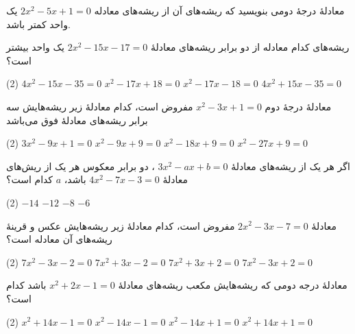 \begin{example}
معادلۀ درجۀ دومی بنویسید که ریشه‌های آن از ریشه‌های
معادله \(2x^2-5x+1=0\) یک واحد کمتر باشد.
\end{example}

\begin{example}
ریشه‌های کدام معادله از دو برابر ریشه‌های معادلۀ
$2x^2-15x-17=0$
یک واحد بیشتر است؟

\begin{tasks}(2)
    \task $4x^2-15x-35=0$
    \task $x^2-17x+18=0$
    \task $x^2-17x-18=0$
    \task $4x^2+15x-35=0$
\end{tasks}
\end{example}

\begin{example}
معادلۀ درجۀ دوم
$x^2-3x+1=0$
مفروض است، کدام معادلۀ زیر ریشه‌هایش سه برابر ریشه‌های معادلۀ فوق می‌باشد

\begin{tasks}(2)
    \task $3x^2-9x+1=0$
    \task $x^2-9x+9=0$
    \task $x^2-18x+9=0$
    \task $x^2-27x+9=0$
\end{tasks}
\end{example}

\begin{example}
اگر هر یک از ریشه‌های معادلۀ
$3x^2-ax+b=0$
، دو برابر معکوس هر یک از ریش‌های معادلۀ
$4x^2-7x-3=0$
باشد، $a$ کدام است؟

\begin{tasks}(2)
    \task $-14$
    \task $-12$
    \task $-8$
    \task $-6$
\end{tasks}
\end{example}

\begin{example}
معادلۀ
$2x^2-3x-7=0$
مفروض است، کدام معادلۀ زیر ریشه‌هایش عکس و قرینۀ ریشه‌های آن معادله است؟

\begin{tasks}(2)
    \task $7x^2-3x-2=0$
    \task $7x^2+3x-2=0$
    \task $7x^2+3x+2=0$
    \task $7x^2-3x+2=0$
\end{tasks}
\end{example}

\begin{example}
معادلۀ درجه دومی که ریشه‌هایش
مکعب ریشه‌های معادلۀ
$x^2+2x-1=0$
باشد  کدام است؟

\begin{tasks}(2)
    \task $x^2+14x-1=0$
    \task $x^2-14x-1=0$
    \task $x^2-14x+1=0$
    \task $x^2+14x+1=0$
\end{tasks}
\end{example}

